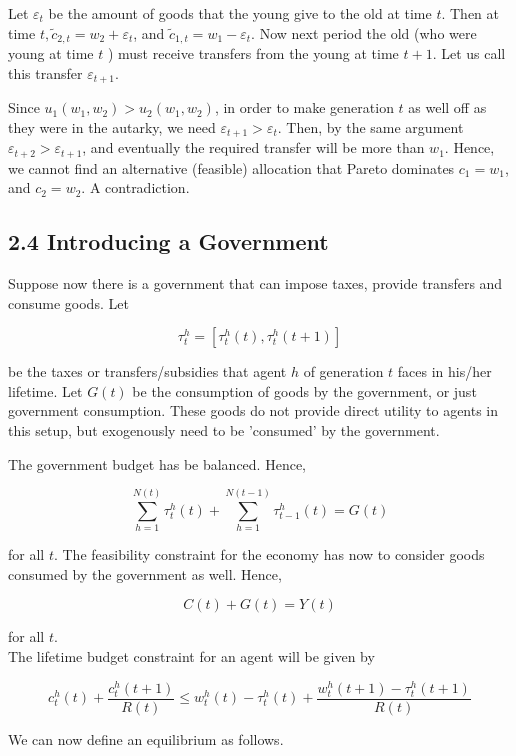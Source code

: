 \documentclass[10pt]{article}
\begin{document}
Let $\varepsilon_{t}$ be the amount of goods that the young give to the old at time $t$. Then at time $t, \widetilde{c}_{2, t}=w_{2}+\varepsilon_{t}$, and $\widetilde{c}_{1, t}=w_{1}-\varepsilon_{t}$. Now next period the old (who were young at time $t$ ) must receive transfers from the young at time $t+1$. Let us call this transfer $\varepsilon_{t+1}$.

Since $u_{1}\left(w_{1}, w_{2}\right)>u_{2}\left(w_{1}, w_{2}\right)$, in order to make generation $t$ as well off as they were in the autarky, we need $\varepsilon_{t+1}>\varepsilon_{t}$. Then, by the same argument $\varepsilon_{t+2}>\varepsilon_{t+1}$, and eventually the required transfer will be more than $w_{1}$. Hence, we cannot find an alternative (feasible) allocation that Pareto dominates $c_{1}=w_{1}$, and $c_{2}=w_{2}$. A contradiction.

\subsection*{2.4 Introducing a Government}
Suppose now there is a government that can impose taxes, provide transfers and consume goods. Let

$$
\tau_{t}^{h}=\left[\tau_{t}^{h}(t), \tau_{t}^{h}(t+1)\right]
$$

be the taxes or transfers/subsidies that agent $h$ of generation $t$ faces in his/her lifetime. Let $G(t)$ be the consumption of goods by the government, or just government consumption. These goods do not provide direct utility to agents in this setup, but exogenously need to be 'consumed' by the government.

The government budget has be balanced. Hence,

$$
\sum_{h=1}^{N(t)} \tau_{t}^{h}(t)+\sum_{h=1}^{N(t-1)} \tau_{t-1}^{h}(t)=G(t)
$$

for all $t$. The feasibility constraint for the economy has now to consider goods consumed by the government as well. Hence,

$$
C(t)+G(t)=Y(t)
$$

for all $t$.\\
The lifetime budget constraint for an agent will be given by

$$
c_{t}^{h}(t)+\frac{c_{t}^{h}(t+1)}{R(t)} \leq w_{t}^{h}(t)-\tau_{t}^{h}(t)+\frac{w_{t}^{h}(t+1)-\tau_{t}^{h}(t+1)}{R(t)}
$$

We can now define an equilibrium as follows.
\end{document}
